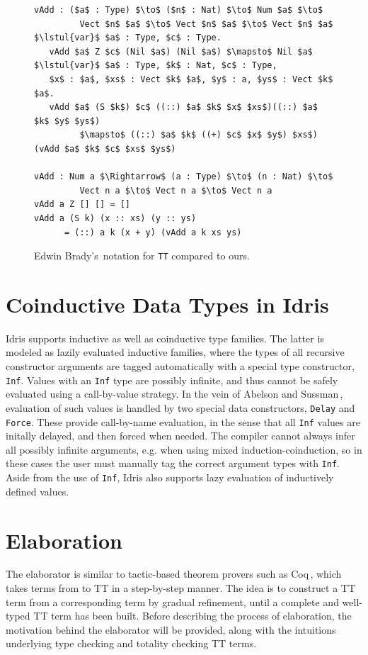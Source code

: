 \newcommand{\lstul}[1]{\ensuremath{\underline{\mbox{ #1}}}}

\begin{figure}[H]
\begin{lstlisting}[mathescape]
vAdd : ($a$ : Type) $\to$ ($n$ : Nat) $\to$ Num $a$ $\to$ 
         Vect $n$ $a$ $\to$ Vect $n$ $a$ $\to$ Vect $n$ $a$
$\lstul{var}$ $a$ : Type, $c$ : Type.
   vAdd $a$ Z $c$ (Nil $a$) (Nil $a$) $\mapsto$ Nil $a$
$\lstul{var}$ $a$ : Type, $k$ : Nat, $c$ : Type,
   $x$ : $a$, $xs$ : Vect $k$ $a$, $y$ : a, $ys$ : Vect $k$ $a$.
   vAdd $a$ (S $k$) $c$ ((::) $a$ $k$ $x$ $xs$)((::) $a$ $k$ $y$ $ys$)
         $\mapsto$ ((::) $a$ $k$ ((+) $c$ $x$ $y$) $xs$) (vAdd $a$ $k$ $c$ $xs$ $ys$)

vAdd : Num a $\Rightarrow$ (a : Type) $\to$ (n : Nat) $\to$ 
         Vect n a $\to$ Vect n a $\to$ Vect n a
vAdd a Z [] [] = []
vAdd a (S k) (x :: xs) (y :: ys)
      = (::) a k (x + y) (vAdd a k xs ys)
\end{lstlisting}  
  \caption{Edwin Brady's\,\citep{BradyIdrisImpl13} notation for \texttt{TT} compared to ours.}
  \label{fig:tt_notation}
\end{figure}

\section{Coinductive Data Types in Idris}
\label{sec:coind-data-types}
Idris supports inductive as well as coinductive type families. The latter is
modeled as lazily evaluated inductive families, where the types of all recursive
constructor arguments are tagged automatically with a special type constructor,
\texttt{Inf}. Values with an \texttt{Inf} type are possibly infinite, and thus
cannot be safely evaluated using a call-by-value strategy. In the vein of Abelson
and Sussman\,\citep{Abelson96SICP}, evaluation of such values is handled by two
special data constructors, \texttt{Delay} and \texttt{Force}. These provide
call-by-name evaluation, in the sense that all \texttt{Inf} values are initally
delayed, and then forced when needed. The compiler cannot always infer all possibly infinite arguments, e.g. when using mixed
induction-coinduction, so in these cases the user must manually tag the correct
argument types with \texttt{Inf}. Aside from the use of \texttt{Inf}, Idris also supports
lazy evaluation of inductively defined values.

\section{Elaboration}
\label{sec:elaboration}
The elaborator is similar to tactic-based theorem provers such as Coq\,\citep{Coq:manual},
which takes terms from \IdrisM{} to TT in a step-by-step manner. The idea is to
construct a TT term from a corresponding \IdrisM{} term by gradual refinement,
until a complete and well-typed TT term has been built. Before describing the
process of elaboration, the motivation behind the elaborator will be provided,
along with the intuitions underlying type checking and totality checking TT terms. 

